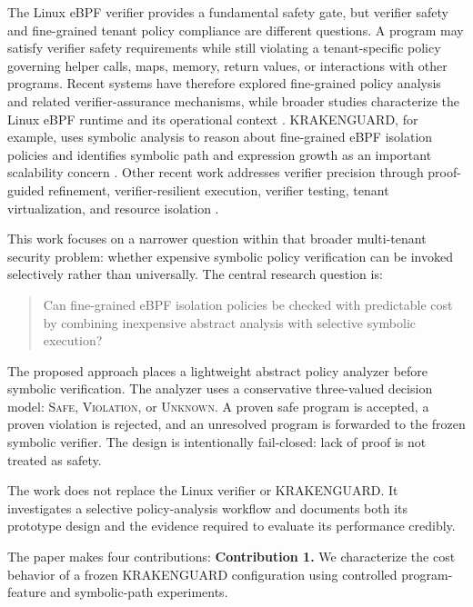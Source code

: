 \documentclass[12pt,a4paper]{article}
\begin{document}
The Linux eBPF verifier provides a fundamental safety gate, but verifier safety and fine-grained tenant policy compliance are different questions. A program may satisfy verifier safety requirements while still violating a tenant-specific policy governing helper calls, maps, memory, return values, or interactions with other programs. Recent systems have therefore explored fine-grained policy analysis and related verifier-assurance mechanisms, while broader studies characterize the Linux eBPF runtime and its operational context \citep{gbadamosi2024ebpfruntime}. KRAKENGUARD, for example, uses symbolic analysis to reason about fine-grained eBPF isolation policies and identifies symbolic path and expression growth as an important scalability concern \citep{patel2026krakenguard}. Other recent work addresses verifier precision through proof-guided refinement, verifier-resilient execution, verifier testing, tenant virtualization, and resource isolation \citep{sun2025bcf,sun2025aee,lyu2025veritas,zhang2026vbpf,carin2026peer}.

This work focuses on a narrower question within that broader multi-tenant security problem: whether expensive symbolic policy verification can be invoked selectively rather than universally. The central research question is:

\begin{quote}
Can fine-grained eBPF isolation policies be checked with predictable cost by combining inexpensive abstract analysis with selective symbolic execution?
\end{quote}

The proposed approach places a lightweight abstract policy analyzer before symbolic verification. The analyzer uses a conservative three-valued decision model: \textsc{Safe}, \textsc{Violation}, or \textsc{Unknown}. A proven safe program is accepted, a proven violation is rejected, and an unresolved program is forwarded to the frozen symbolic verifier. The design is intentionally fail-closed: lack of proof is not treated as safety.

The work does not replace the Linux verifier or KRAKENGUARD. It investigates a selective policy-analysis workflow and documents both its prototype design and the evidence required to evaluate its performance credibly.

The paper makes four contributions:
\noindent\textbf{Contribution 1.} We characterize the cost behavior of a frozen KRAKENGUARD configuration using controlled program-feature and symbolic-path experiments.
\end{document}

